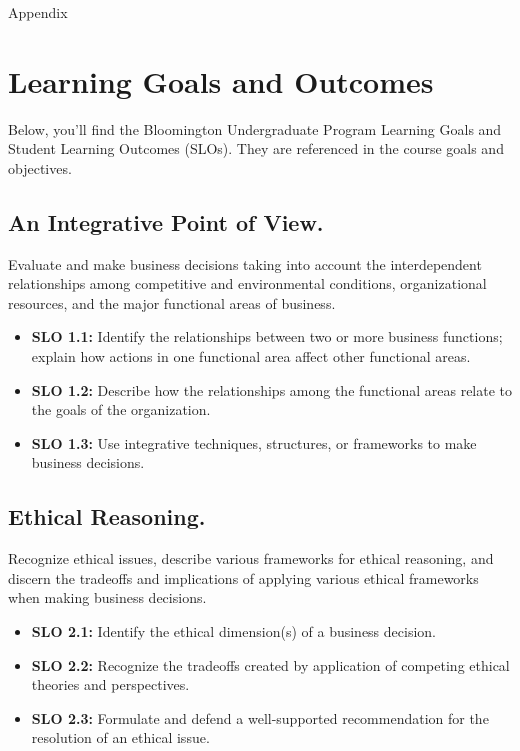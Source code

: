 \documentclass[12pt]{article} %
\begin{document}
\pagebreak
\begin{center}
	\Large Appendix
\end{center}
\tableofcontents
\pagebreak
\section{Learning Goals and Outcomes}
Below, you'll find the Bloomington Undergraduate Program Learning Goals and Student Learning Outcomes (SLOs). They are referenced in the course goals and objectives. 

\subsection{An Integrative Point of View.}
Evaluate and make business decisions taking into account the interdependent relationships among competitive and environmental conditions, organizational resources, and the major functional areas of business.
\begin{itemize} 
	\item\textbf{SLO 1.1:} Identify the relationships between two or more business functions; explain how actions in one functional area affect other functional areas.
	\item\textbf{SLO 1.2:} Describe how the relationships among the functional areas relate to the goals of the organization.
	\item\textbf{SLO 1.3:} Use integrative techniques, structures, or frameworks to make business decisions.
\end{itemize}
\subsection{Ethical Reasoning.}
Recognize ethical issues, describe various frameworks for ethical reasoning, and discern the tradeoffs and implications of applying various ethical frameworks when making business decisions.
\begin{itemize}
	\item\textbf{SLO 2.1:} Identify the ethical dimension(s) of a business decision.
	\item\textbf{SLO 2.2:} Recognize the tradeoffs created by application of competing ethical theories and perspectives.
	\item\textbf{SLO 2.3:} Formulate and defend a well-supported recommendation for the resolution of an ethical issue.
\end{itemize}
\end{document}

